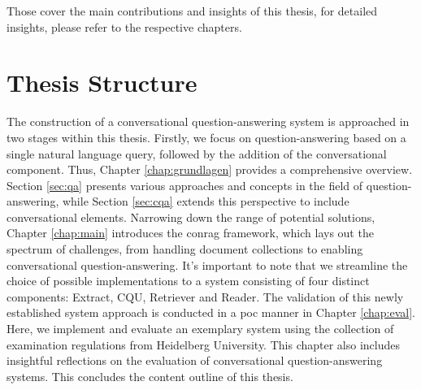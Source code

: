 Those cover the main contributions and insights of this thesis, for detailed insights, please refer to the respective chapters. 

\section{Thesis Structure}

The construction of a conversational question-answering system is approached in two stages within this thesis. Firstly, we focus on question-answering based on a single natural language query, followed by the addition of the conversational component. Thus, Chapter \ref{chap:grundlagen} provides a comprehensive overview. Section \ref{sec:qa} presents various approaches and concepts in the field of question-answering, while Section \ref{sec:cqa} extends this perspective to include conversational elements. Narrowing down the range of potential solutions, Chapter \ref{chap:main} introduces the \gls{conrag} framework, which lays out the spectrum of challenges, from handling document collections to enabling conversational question-answering. It's important to note that we streamline the choice of possible implementations to a system consisting of four distinct components: Extract, CQU, Retriever and Reader. The validation of this newly established system approach is conducted in a \gls{poc} manner in Chapter \ref{chap:eval}. Here, we implement and evaluate an exemplary system using the collection of examination regulations from Heidelberg University. This chapter also includes insightful reflections on the evaluation of conversational question-answering systems. This concludes the content outline of this thesis.
